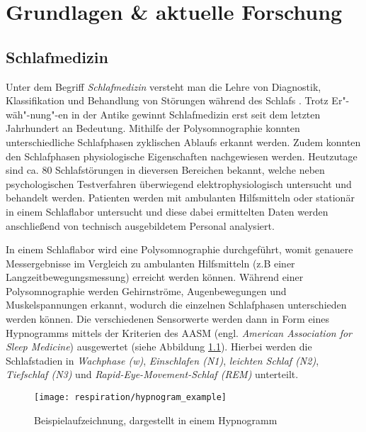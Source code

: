 
\chapter{Grundlagen \& aktuelle Forschung}
\label{ch:Basics}

\section{Schlafmedizin}
\label{ch:Basics:se:schlafmedizin}
Unter dem Begriff \textit{Schlafmedizin} versteht man die Lehre von Diagnostik, Klassifikation und Behandlung von Störungen während des Schlafs \cite{croenleinSchlafmedizin1x1Praxisorientiertes2017}. 
Trotz Er"-wäh"-nung"-en in der Antike gewinnt Schlafmedizin erst seit dem letzten Jahrhundert an Bedeutung.
Mithilfe der Polysomnographie konnten unterschiedliche Schlafphasen zyklischen Ablaufs erkannt werden.
Zudem konnten den Schlafphasen physiologische Eigenschaften nachgewiesen werden.
Heutzutage sind ca. 80 Schlafstörungen in dieversen Bereichen bekannt, welche neben psychologischen Testverfahren überwiegend elektrophysiologisch untersucht und behandelt werden.
Patienten werden mit ambulanten Hilfsmitteln oder stationär in einem Schlaflabor untersucht und diese dabei ermittelten Daten werden anschließend von technisch ausgebildetem Personal analysiert.

In einem Schlaflabor wird eine Polysomnographie durchgeführt, womit genauere Messergebnisse im Vergleich zu ambulanten Hilfsmitteln (z.B einer Langzeitbewegungsmessung) erreicht werden können.
Während einer Polysomnographie werden Gehirnströme, Augenbewegungen und Muskelspannungen erkannt, wodurch die einzelnen Schlafphasen unterschieden werden können.
Die verschiedenen Sensorwerte werden dann in Form eines Hypnogramms mittels der Kriterien des AASM (engl. \textit{American Association for Sleep Medicine}) ausgewertet (siehe Abbildung \ref{hypnogram_example}). 
Hierbei werden die Schlafstadien in \textit{Wachphase (w)}, \textit{Einschlafen (N1)}, \textit{leichten Schlaf (N2)}, \textit{Tiefschlaf (N3)} und \textit{Rapid-Eye-Movement-Schlaf (REM)} unterteilt.

\begin{figure}[ht]
    \centering
    \texttt{[image: respiration/hypnogram\_example]}
    \caption{Beispielaufzeichnung, dargestellt in einem Hypnogramm \cite{stuckPraxisSchlafmedizinDiagnostik2018}}
    \label{hypnogram_example}
\end{figure}

